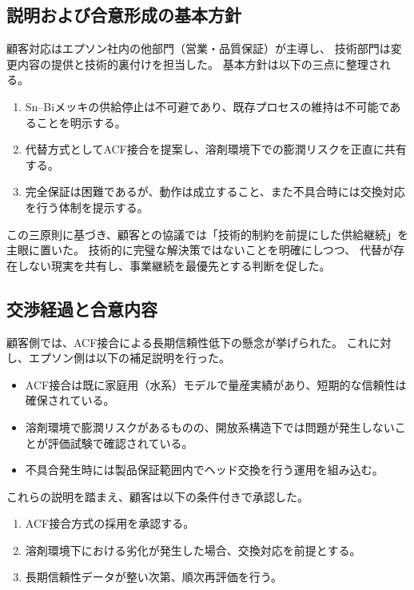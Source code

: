 \documentclass[conference]{IEEEtran}
\begin{document}
\subsection{説明および合意形成の基本方針}
顧客対応はエプソン社内の他部門（営業・品質保証）が主導し、  
技術部門は変更内容の提供と技術的裏付けを担当した。  
基本方針は以下の三点に整理される。

\begin{enumerate}
  \item Sn–Biメッキの供給停止は不可避であり、既存プロセスの維持は不可能であることを明示する。  
  \item 代替方式としてACF接合を提案し、溶剤環境下での膨潤リスクを正直に共有する。  
  \item 完全保証は困難であるが、動作は成立すること、また不具合時には交換対応を行う体制を提示する。  
\end{enumerate}

この三原則に基づき、顧客との協議では「技術的制約を前提にした供給継続」を主眼に置いた。  
技術的に完璧な解決策ではないことを明確にしつつ、  
代替が存在しない現実を共有し、事業継続を最優先とする判断を促した。

\subsection{交渉経過と合意内容}
顧客側では、ACF接合による長期信頼性低下の懸念が挙げられた。  
これに対し、エプソン側は以下の補足説明を行った。

\begin{itemize}
  \item ACF接合は既に家庭用（水系）モデルで量産実績があり、短期的な信頼性は確保されている。  
  \item 溶剤環境で膨潤リスクがあるものの、開放系構造下では問題が発生しないことが評価試験で確認されている。  
  \item 不具合発生時には製品保証範囲内でヘッド交換を行う運用を組み込む。  
\end{itemize}

これらの説明を踏まえ、顧客は以下の条件付きで承認した。

\begin{enumerate}
  \item ACF接合方式の採用を承認する。  
  \item 溶剤環境下における劣化が発生した場合、交換対応を前提とする。  
  \item 長期信頼性データが整い次第、順次再評価を行う。  
\end{enumerate}
\end{document}
